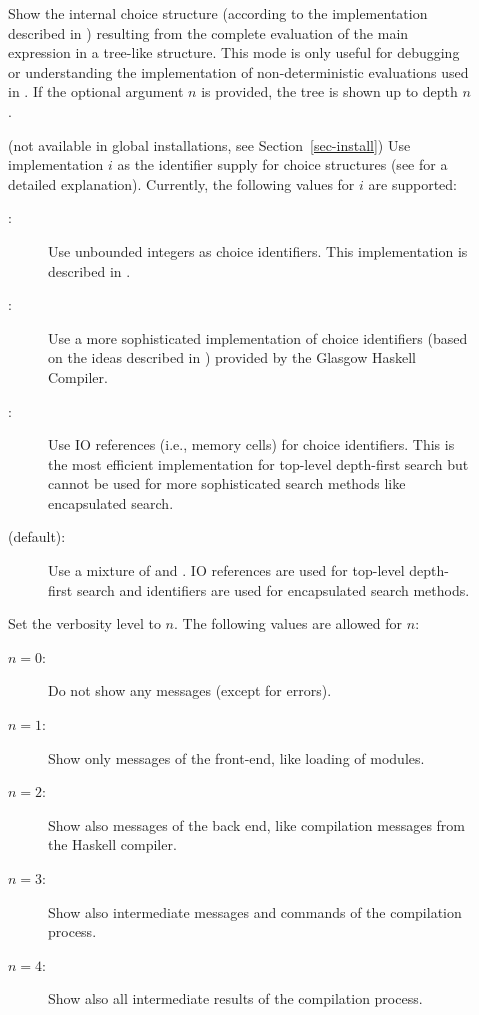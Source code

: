 \begin{description}
\item[]
Show the internal choice structure
(according to the implementation described in
\cite{BrasselHanusPeemoellerReck11})
resulting from the complete evaluation of the main expression
in a tree-like structure.
This mode is only useful for debugging or
understanding the implementation of non-deterministic
evaluations used in \CYS.
If the optional argument $n$ is provided,
the tree is shown up to depth $n$.

\item[]
(not available in global installations, see Section~\ref{sec-install})
Use implementation $i$ as the identifier supply for choice structures
(see \cite{BrasselHanusPeemoellerReck11} for a detailed explanation).
Currently, the following values for $i$ are supported:
\begin{description}
\item[:]
Use unbounded integers as choice identifiers.
This implementation is described in \cite{BrasselHanusPeemoellerReck11}.
\item[:]
Use a more sophisticated implementation of choice
identifiers (based on the ideas described in \cite{AugustssonRittriSynek94})
provided by the Glasgow Haskell Compiler.
\item[:]
Use IO references (i.e., memory cells) for choice identifiers.
This is the most efficient implementation for top-level depth-first search
but cannot be used for more sophisticated search methods
like encapsulated search.
\item[ (default):]
Use a mixture of  and .
IO references are used for top-level depth-first search
and  identifiers are used for encapsulated search methods.
\end{description}

\item[]
Set the verbosity level to $n$. The following values are allowed
for $n$:
\begin{description}
\item[$n=0$:] Do not show any messages (except for errors).
\item[$n=1$:] Show only messages of the front-end, like loading
of modules.
\item[$n=2$:]
Show also messages of the back end, like compilation messages
from the Haskell compiler.
\item[$n=3$:]
Show also intermediate messages and commands of the compilation
process.
\item[$n=4$:]
Show also all intermediate results of the compilation process.
\end{description}


\end{description}
